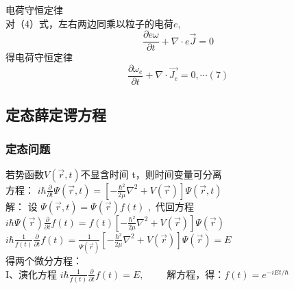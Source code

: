 \begin{frame}\frametitle{}
    {\Bullet} 电荷守恒定律\\ \vspace{0.3em}
    对（4）式，左右两边同乘以粒子的电荷$e$, 
    \begin{equation*}
        \frac{\partial e\omega}{\partial t}+ \nabla \cdot e\vec{J}=0
    \end{equation*}  
    得电荷守恒定律
    \begin{equation*}
        \frac{\partial \omega_e}{\partial t}+ \nabla \cdot \vec{J_e}=0, \cdots (7)
    \end{equation*}  
\end{frame}

\subsection{定态薛定谔方程}

\begin{frame} 
    \frametitle{定态问题}
    若势函数$V(\vec{r},t ) $不显含时间 t，则时间变量可分离 \\ \vspace{0.3cm}
    方程： { $ \displaystyle i \hbar \frac{\partial }{\partial t} \Psi (\vec{r},t ) =\left [- \frac{\hbar^2}{2\mu }\nabla ^2 + V(\vec{r}) \right ]\Psi (\vec{r},t ) $}  \\  \vspace{0.3cm}
    \alert{解：}  设  $\Psi (\vec{r},t )  = \Psi (\vec{r} ) f(t) $ , 代回方程 \\ 
     { $ \displaystyle i\hbar \Psi (\vec{r})  \frac{\partial }{\partial t} f(t)=f(t) \left [ -\frac{\hbar^2}{2\mu }\nabla ^2 + V(\vec{r}) \right ]\Psi (\vec{r}) $}  \\ 	
     { $ \displaystyle i\hbar \frac{1}{f(t)}  \frac{\partial }{\partial t} f(t)= \frac{1}{\Psi (\vec{r}) } \left [ -\frac{\hbar^2}{2\mu }\nabla ^2 + V(\vec{r}) \right ]\Psi (\vec{r}) =E $}  \\ \vspace{0.3cm} 
     得两个微分方程：\\  \vspace{0.3cm}
     I、演化方程  $ \displaystyle  i\hbar \frac{1}{f(t)}  \frac{\partial }{\partial t} f(t)=E, \qquad $  
        解方程，得：$\displaystyle  f(t) =e^{-iEt/\hbar}$ 
\end{frame}

